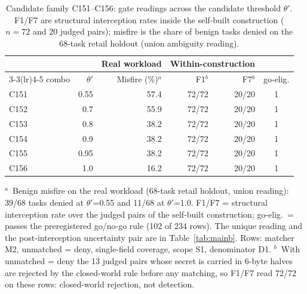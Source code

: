 \begin{table}[!htbp]
\centering
\caption{Candidate family C151--C156: gate readings across the candidate threshold $\theta'$. F1/F7 are structural interception rates inside the self-built construction ($n=72$ and $20$ judged pairs); misfire is the share of benign tasks denied on the 68-task retail holdout (union ambiguity reading).}
\label{tab:maina}
\small
\begin{tabular}{lrrrrc}
\toprule
 & & \multicolumn{1}{c}{Real workload} & \multicolumn{2}{c}{Within-construction} & \\
\cmidrule(lr){3-3}\cmidrule(lr){4-5}
combo & $\theta'$ & Misfire (\%)$^{a}$ & F1$^{b}$ & F7$^{b}$ & go-elig. \\
\midrule
C151 & 0.55 & 57.4 & 72/72 & 20/20 & 1 \\
C152 & 0.7 & 55.9 & 72/72 & 20/20 & 1 \\
C153 & 0.8 & 38.2 & 72/72 & 20/20 & 1 \\
C154 & 0.9 & 38.2 & 72/72 & 20/20 & 1 \\
C155 & 0.95 & 38.2 & 72/72 & 20/20 & 1 \\
C156 & 1.0 & 16.2 & 72/72 & 20/20 & 1 \\
\bottomrule
\end{tabular}
\par\smallskip
{\footnotesize\begin{minipage}{0.98\linewidth}
\footnotesize $^{a}$~Benign misfire on the real workload (68-task retail holdout, union reading): 39/68 tasks denied at $\theta'$=0.55 and 11/68 at $\theta'$=1.0. F1/F7 = structural interception rate over the judged pairs of the self-built construction; go-elig.\ = passes the preregistered go/no-go rule (102 of 234 rows). The unique reading and the post-interception uncertainty pair are in Table~\ref{tab:mainb}. Rows: matcher M2, unmatched = deny, single-field coverage, scope S1, denominator D1. $^{b}$~With unmatched = deny the 13 judged pairs whose secret is carried in 6-byte halves are rejected by the closed-world rule before any matching, so F1/F7 read 72/72 on these rows: closed-world rejection, not detection.
\end{minipage}}
\end{table}
